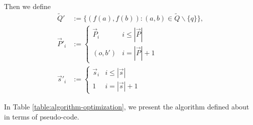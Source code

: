 \documentclass[twocolumn,showpacs,preprintnumbers,amsmath,amssymb,nofootinbib,pra,floatfix]{revtex4-1}
\newenvironment{definition}[1][Definition]{\begin{trivlist}
\item[\hskip \labelsep {\bfseries #1}]}{\end{trivlist}}
\newcommand{\lst}{\vec}
\newcommand{\set}{\tilde}
\begin{document}
\begin{definition}
Then we define
$$
\begin{aligned}
\set Q'&:= \{(f(a),f(b)):(a,b)\in\set Q\backslash\{q\}\},\\
\lst P'_i&:=
\begin{cases}
\lst P_i & i \le |\lst P| \\
(o,b') & i = |\lst P|+1
\end{cases} \\
\lst s'_i&:=
\begin{cases}
\lst s_i & i \le |\lst s|\\
1 & i = |\lst s|+1
\end{cases}
\end{aligned}
$$

\end{definition}
In Table \ref{table:algorithm-optimization}, we present the algorithm defined about in terms of pseudo-code.
\end{document}
